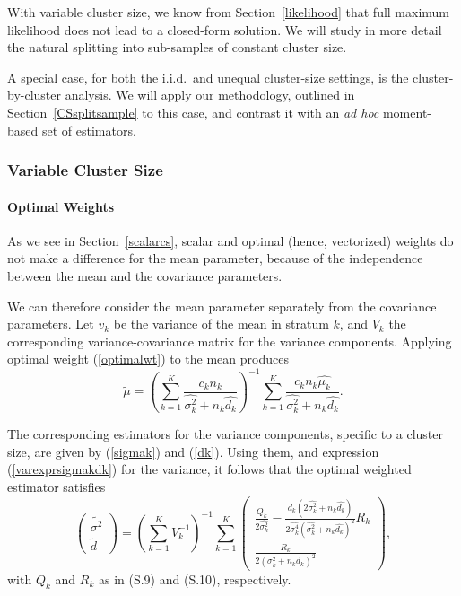 \documentclass[11pt,a5paper,twoside]{book}
\let\oldparagraph\paragraph
\renewcommand{\paragraph}[1]{\oldparagraph{#1}\mbox{}}
\begin{document}
With variable cluster size, we know from 
Section~\ref{likelihood} 
that full maximum likelihood does not 
lead to a closed-form solution. We will study in more detail 
the natural splitting into sub-samples of constant cluster size.

A special case, for both the i.i.d.\  and 
unequal cluster-size settings, is the cluster-by-cluster 
analysis. We will apply our methodology, outlined in 
Section~\ref{CSsplitsample} 
to this case, and contrast it with 
an {\em ad hoc\/} moment-based set of estimators.

\subsubsection{Variable Cluster Size}

\paragraph{Optimal Weights}\label{owcs}

As we see in Section~\ref{scalarcs}, 
scalar and optimal (hence, vectorized) weights do not make a difference for the mean parameter, 
because of the independence between the mean and the covariance parameters.

We can therefore consider the mean parameter separately from the 
covariance parameters. Let $v_k$ be the variance of the mean in 
stratum $k$, and $V_k$ the corresponding variance-covariance matrix 
for the variance components. Applying optimal weight (\ref{optimalwt}) 
to the mean produces
\begin{equation}
\label{meanident1}
\widetilde{\mu}=\left(\sum_{k=1}^K\frac{c_kn_k}{\widehat{\sigma^2_k}+n_k\widehat{d_k}}\right)^{-1}
\sum_{k=1}^K\frac{c_kn_k\widehat{\mu_k}}{\widehat{\sigma^2_k}+n_k\widehat{d_k}}.
\end{equation}


The corresponding estimators for the variance components, 
specific to a cluster size, are given by (\ref{sigmak}) and (\ref{dk}). 
Using them, and expression (\ref{varexprsigmakdk}) for the variance, 
it follows that the optimal weighted estimator satisfies
\begin{equation}
\label{ident1}
\left(
\begin{array}{c}
\widetilde{\sigma^2}\\
\widetilde{d}
\end{array}
\right)
=
\left(\sum_{k=1}^KV_k^{-1}\right)^{-1}
\sum_{k=1}^K
\left(
\begin{array}{c}
\frac{Q_k}{2\widehat{\sigma^2_k}}-\frac{d_k(2\widehat{\sigma^2_k}+n_k\widehat{d_k})}
{2\widehat{\sigma^4_k}(\widehat{\sigma^2_k}+n_k\widehat{d_k})^2}R_k\\
\frac{R_k}{2(\sigma_k^2+n_kd_k)^2}
\end{array}
\right)
,
\end{equation}
with $Q_k$ and $R_k$ as in (S.9) and (S.10),
respectively.
\end{document}
